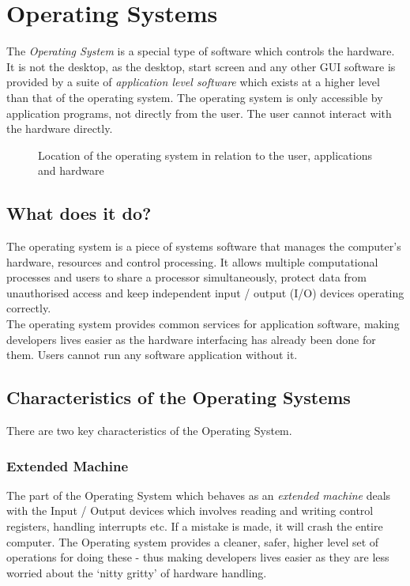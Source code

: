 
\section{Operating Systems}
The \textit{Operating System} is a special type of software which controls the hardware. It is not the desktop, as the desktop, start screen and any other GUI software is provided by a suite of \textit{application level software} which exists at a higher level than that of the operating system. The operating system is only accessible by application programs, not directly from the user. The user cannot interact with the hardware directly.
\begin{figure}[H]
    \centering
    
    \caption{Location of the operating system in relation to the user, applications and hardware}
\end{figure}

\subsection{What does it do?}
The operating system is a piece of systems software that manages the computer's hardware, resources and control processing. It allows multiple computational processes and users to share a processor simultaneously, protect data from unauthorised access and keep independent input / output (I/O) devices operating correctly.\\

The operating system provides common services for application software, making developers lives easier as the hardware interfacing has already been done for them. Users cannot run any software application without it.

\subsection{Characteristics of the Operating Systems}
There are two key characteristics of the Operating System.
\subsubsection{Extended Machine}
The part of the Operating System which behaves as an \textit{extended machine} deals with the Input / Output devices which involves reading and writing control registers, handling interrupts etc. If a mistake is made, it will crash the entire computer. The Operating system provides a cleaner, safer, higher level set of operations for doing these - thus making developers lives easier as they are less worried about the `nitty gritty' of hardware handling.
